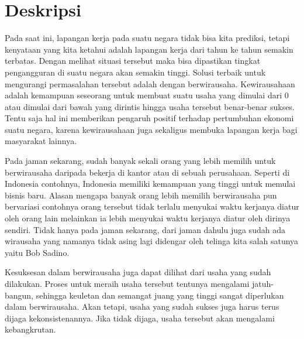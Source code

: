 \documentclass[a4paper,twoside]{article}
\begin{document}
\title{\@judultopik}
\author{\nama \textendash \@npm} 

\newcommand{\nama}{Lionov}
\newcommand{\@npm}{1997730020}
\newcommand{\@judultopik}{Simulasi Kerumunan di Museum} %
\newcommand{\jumpemb}{1} %
\newcommand{\tanggal}{01/01/1900}


\maketitle


\section{Deskripsi}
Pada saat ini, lapangan kerja pada suatu negara tidak bisa kita prediksi, tetapi kenyataan yang kita ketahui adalah lapangan kerja dari tahun ke tahun semakin terbatas. Dengan melihat situasi tersebut maka bisa dipastikan tingkat pengangguran di suatu negara akan semakin tinggi. Solusi terbaik untuk mengurangi permasalahan tersebut adalah dengan berwirausaha. Kewirausahaan adalah kemampuan seseorang untuk membuat suatu usaha yang dimulai dari 0 atau dimulai dari bawah yang dirintis hingga usaha tersebut benar-benar sukses. Tentu saja hal ini memberikan pengaruh positif terhadap pertumbuhan ekonomi suatu negara, karena kewirausahaan juga sekaligus membuka lapangan kerja bagi masyarakat lainnya.

 
Pada jaman sekarang, sudah banyak sekali orang yang lebih memilih untuk berwirausaha daripada bekerja di kantor atau di sebuah perusahaan. Seperti di Indonesia contohnya, Indonesia memiliki kemampuan yang tinggi untuk memulai bisnis baru. Alasan mengapa banyak orang lebih memilih berwirausaha pun bervariasi contohnya orang tersebut tidak terlalu menyukai waktu kerjanya diatur oleh orang lain melainkan ia lebih menyukai waktu kerjanya diatur oleh dirinya sendiri. Tidak hanya pada jaman sekarang, dari jaman dahulu juga sudah ada wirausaha yang namanya tidak asing lagi didengar oleh telinga kita salah satunya yaitu Bob Sadino.


Kesuksesan dalam berwirausaha juga dapat dilihat dari usaha yang sudah dilakukan. Proses untuk meraih usaha tersebut tentunya mengalami jatuh-bangun, sehingga keuletan dan semangat juang yang tinggi sangat diperlukan dalam berwirausaha. Akan tetapi, usaha yang sudah sukses juga harus terus dijaga kekonsistenannya. Jika tidak dijaga, usaha tersebut akan mengalami kebangkrutan. 
\end{document}
